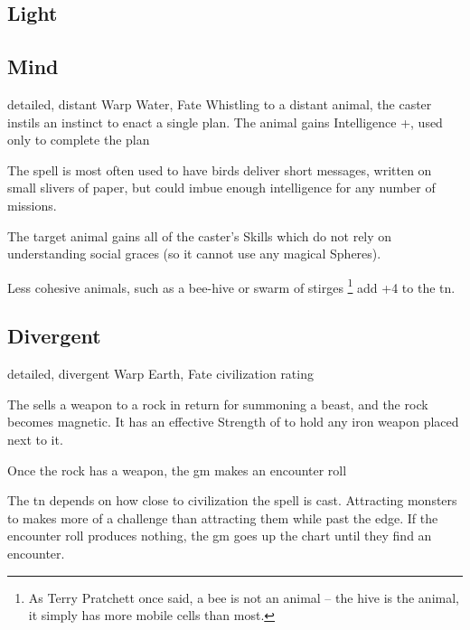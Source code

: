 \begin{multicols}{2}
\subsection{Light}


\subsection{Mind}

\label{carrierCrow}
  {detailed, distant}%
  {Warp}%
  {Water, Fate}%
  {}%
  {Whistling to a distant animal, the caster instils an instinct to enact a single plan.
  The animal gains Intelligence +, used only to complete the plan}%
  {
  The spell is most often used to have birds deliver short messages, written on small slivers of paper, but could imbue enough intelligence for any number of missions.

  The target animal gains all of the caster's Skills which do not rely on understanding social graces (so it cannot use any magical Spheres).

  Less cohesive animals, such as a bee-hive or swarm of stirges%
  \footnote{As Terry Pratchett once said, a bee is not an animal -- the hive is the animal, it simply has more mobile cells than most.}
  add +4 to the \gls{tn}.
  }


\subsection{Divergent}

  {detailed, divergent}%
  {Warp}%
  {Earth, Fate}%
  {civilization rating}%
  {The sells a weapon to a rock in return for summoning a beast, and the rock becomes magnetic.
  It has an effective Strength of  to hold any iron weapon placed next to it.

  Once the rock has a weapon, the \gls{gm} makes an encounter roll}%
  {
    The \gls{tn} depends on how close to civilization the spell is cast.
    Attracting monsters to  makes more of a challenge than attracting them while past the \gls{edge}.%
    If the encounter roll produces nothing, the \gls{gm} goes up the chart until they find an encounter.

}
\end{multicols}
